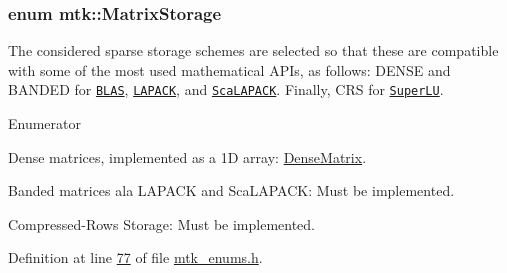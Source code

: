 \hypertarget{group__c02-enums_ga25b67ec6a2afeee69f9bb196a9c66619}{
\subsubsection[{Matrix\+Storage}]{\setlength{\rightskip}{0pt plus 5cm}enum {\bf mtk\+::\+Matrix\+Storage}}}\label{group__c02-enums_ga25b67ec6a2afeee69f9bb196a9c66619}
The considered sparse storage schemes are selected so that these are compatible with some of the most used mathematical A\+P\+Is, as follows\+: D\+E\+N\+S\+E and B\+A\+N\+D\+E\+D for \href{http://www.netlib.org/blas/}{\tt B\+L\+A\+S}, \href{http://www.netlib.org/lapack/}{\tt L\+A\+P\+A\+C\+K}, and \href{http://www.netlib.org/scalapack/}{\tt Sca\+L\+A\+P\+A\+C\+K}. Finally, C\+R\+S for \href{http://crd.lbl.gov/~xiaoye/SuperLU/}{\tt Super\+L\+U}. \begin{Desc}
\item[Enumerator]\par
\begin{description}
\item[{\em 
\hypertarget{group__c02-enums_ga25b67ec6a2afeee69f9bb196a9c66619a00a806d43a7d74e9ccca47a2134e9c87}{D\+E\+N\+S\+E}\label{group__c02-enums_ga25b67ec6a2afeee69f9bb196a9c66619a00a806d43a7d74e9ccca47a2134e9c87}
}]Dense matrices, implemented as a 1\+D array\+: \hyperlink{classmtk_1_1DenseMatrix}{Dense\+Matrix}. \item[{\em 
\hypertarget{group__c02-enums_ga25b67ec6a2afeee69f9bb196a9c66619aef1d4271d5005282978a3a40a8a52c9b}{B\+A\+N\+D\+E\+D}\label{group__c02-enums_ga25b67ec6a2afeee69f9bb196a9c66619aef1d4271d5005282978a3a40a8a52c9b}
}]Banded matrices ala L\+A\+P\+A\+C\+K and Sca\+L\+A\+P\+A\+C\+K\+: Must be implemented. \item[{\em 
\hypertarget{group__c02-enums_ga25b67ec6a2afeee69f9bb196a9c66619a87619d374775e937bca967402b988b8b}{C\+R\+S}\label{group__c02-enums_ga25b67ec6a2afeee69f9bb196a9c66619a87619d374775e937bca967402b988b8b}
}]Compressed-\/\+Rows Storage\+: Must be implemented. \end{description}
\end{Desc}


Definition at line \hyperlink{mtk__enums_8h_source_l00077}{77} of file \hyperlink{mtk__enums_8h_source}{mtk\+\_\+enums.\+h}.

